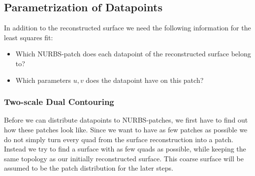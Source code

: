 \subsection{Parametrization of Datapoints}
\label{ssec:parametrization}
In addition to the reconstructed surface we need the following information for the least squares fit: 
\begin{itemize}
\item Which \ac{NURBS}-patch does each datapoint of the reconstructed surface belong to?
\item Which parameters $u,v$ does the datapoint have on this patch?
\end{itemize}
\subsubsection{Two-scale Dual Contouring}
Before we can distribute datapoints to \ac{NURBS}-patches, we first have to find out how these patches look like. Since we want to have as few patches as possible we do not simply turn every \ac{quad} from the surface reconstruction into a patch. Instead  we try to find a surface with as few \acp{quad} as possible, while keeping the same topology as our initially reconstructed surface. This coarse surface will be assumed to be the patch distribution for the later steps.



